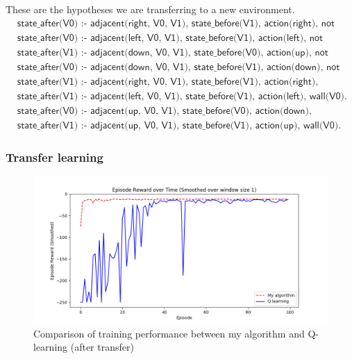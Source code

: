 These are the hypotheses we are transferring to a new environment. 
\begin{equation*}
\begin{split}
 &\textsf{state\_after(V0) :- adjacent(right, V0, V1), state\_before(V1), action(right), not wall(V0).}\\
 &\textsf{state\_after(V0) :- adjacent(left, V0, V1), state\_before(V1), action(left), not wall(V0).}\\
 &\textsf{state\_after(V1) :- adjacent(down, V0, V1), state\_before(V0), action(up), not wall(V1).}\\
 &\textsf{state\_after(V0) :- adjacent(down, V0, V1), state\_before(V1), action(down), not wall(V0).}\\
 &\textsf{state\_after(V1) :- adjacent(right, V0, V1), state\_before(V1), action(right), wall(V0).}\\
 &\textsf{state\_after(V1) :- adjacent(left, V0, V1), state\_before(V1), action(left), wall(V0).}\\
 &\textsf{state\_after(V0) :- adjacent(up, V0, V1), state\_before(V0), action(down), wall(V1).}\\
 &\textsf{state\_after(V1) :- adjacent(up, V0, V1), state\_before(V1), action(up), wall(V0).}
\end{split}
\end{equation*}

\subsubsection{Transfer learning}
\begin{figure}[!htb]
\centering
\includegraphics[width=1.0\textwidth]{./figures/experiment4_after_training}
\caption{Comparison of training performance between my algorithm and Q-learning (after transfer)}
\label{experiment3_training}
\end{figure}

